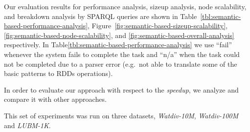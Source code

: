Our evaluation results for performance analysis, sizeup analysis, node scalability, and breakdown analysis by \gls{SPARQL} queries are shown in Table~\ref{tbl:semantic-based-performance-analysis}, Figure~\ref{fig:semantic-based-sizeup-scalability}, \ref{fig:semantic-based-node-scalability}, and \ref{fig:semantic-based-overall-analysis} respectively.
In Table\ref{tbl:semantic-based-performance-analysis} we use ``fail'' whenever the system fails to complete the task and ``n/a'' when the task could not be completed due to a parser error (e.g.\ not able to translate some of the basic patterns to \gls{RDD}s operations).

In order to evaluate our approach with respect to the \textit{speedup}, we analyze and compare it with other approaches.

This set of experiments was run on three datasets, \emph{Watdiv-10M}, \emph{Watdiv-100M} and \emph{LUBM-1K}.

